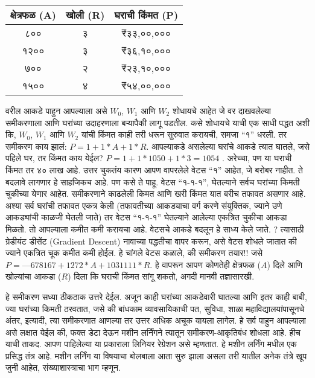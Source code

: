 \begin{table}[h!]
\centering
\begin{tabular}{|c|c|c|}
\hline
\textbf{क्षेत्रफळ (A)} & \textbf{खोली (R)} & \textbf{घराची किंमत (P)} \\
\hline
८०० & ३ & ₹३३,००,००० \\
१२०० & ३ & ₹३६,१०,००० \\
७०० & २ & ₹२३,१०,००० \\
१५०० & ४ & ₹५४,००,००० \\
\hline
\end{tabular}
\end{table}


वरील आकडे पाहुन आपल्याला असे $W_0$, $W_1$ आणि $W_2$ शोधायचे आहेत जे वर दाखवलेल्या समीकरणाला आणि घरांच्या उदाहरणाला बऱ्यापैकी लागू पडतील. कसे शोधायचे याची एक साधी पद्धत अशी कि, $W_0$, $W_1$ आणि $W_2$ यांची किंमत काही तरी धरून सुरुवात करायची, समजा ``१'' धरली. तर समीकरण काय झालं: $P = 1+ 1 *A + 1 *R$. आपल्याकडे असलेल्या घरांचे आकडे त्यात घातले, जसे पहिले घर, तर किंमत काय येईल? $P = 1+ 1 * 1050 + 1*3 = 1054$ . अरेच्चा, पण या घराची किंमत तर ४० लाख आहे. उत्तर चुकतंय कारण आपण वापरलेले वेटस ``१'' आहेत, जे बरोबर नाहीत. ते बदलावे लागणार हे साहजिकच आहे. पण कसे ते पाहू. वेटस ``१-१-१'', घेतल्याने सर्वच घरांच्या किमती चुकीच्या येणार आहेत. समीकरणाने काढलेली किमत आणि खरी किंमत यात बरीच तफावत असणार आहे. अश्या सर्व घरांची तफावत एकत्र केली (तफावतीच्या आकड्याचा वर्ग करणे संयुक्तिक, ज्याने उणे आकड्यांची काळजी घेतली जाते) तर वेटस ``१-१-१'' घेतल्याने आलेल्या एकत्रित चुकीचा आकडा मिळतो. तो आपल्याला कमीत कमी करायचा आहे. वेटसचे आकडे बदलून हे साध्य केले जाते. ? त्यासाठी ग्रेडीयंट डीसेंट (Gradient Descent) नावाच्या पद्धतीचा वापर करून, असे वेटस शोधले जातात की ज्याने एकत्रित चूक कमीत कमी होईल. हे चांगले वेटस कळाले, की समीकरण तयार!! जसे $P = —678167 + 1272 * A + 1031111 * R$. हे वापरून आपण कोणतेही क्षेत्रफळ ($A$) दिले आणि खोल्यांचा आकडा ($R$) दिला कि घराची किंमत सांगू शकतो, अगदी मानवी तज्ञासारखी.

हे समीकरण सध्या ठीकठाक उत्तरे देईल. अजून काही घरांच्या आकडेवारी घातल्या आणि इतर काही बाबी, ज्या घरांच्या किमती ठरवतात, जसे की बांधकाम व्यावसायिकाची पत, सुविधा, शाळा महाविद्यालयांपासूनचे अंतर, इत्यादी, त्या समीकरणात आणल्या तर उत्तर अधिक अचूक यायला लागेल. हे सर्व पाहुन आपल्याला असे लक्षात येईल की, फक्त डेटा देऊन मशीन लर्निंगने त्यातून समीकरण-आकृतिबंध शोधला आहे. हीच याची ताकद. आपण पाहिलेल्या या प्रकाराला लिनियर रेग्रेशन असे म्हणतात. हे मशीन लर्निंग मधील एक प्रसिद्ध तंत्र आहे. मशीन लर्निंग या विषयाचा बोलबाला आता सुरु झाला असला तरी यातील अनेक तंत्रे खूप जुनी आहेत, संख्याशास्त्राचा भाग म्हणून.

